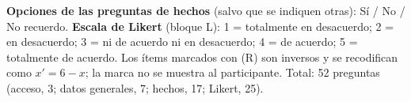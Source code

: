 
\noindent\textbf{Opciones de las preguntas de hechos} (salvo que se indiquen otras): Sí / No / No recuerdo. \textbf{Escala de Likert} (bloque L): 1 = totalmente en desacuerdo; 2 = en desacuerdo; 3 = ni de acuerdo ni en desacuerdo; 4 = de acuerdo; 5 = totalmente de acuerdo. Los ítems marcados con (R) son inversos y se recodifican como $x' = 6 - x$; la marca no se muestra al participante. Total: 52 preguntas (acceso, 3; datos generales, 7; hechos, 17; Likert, 25).

